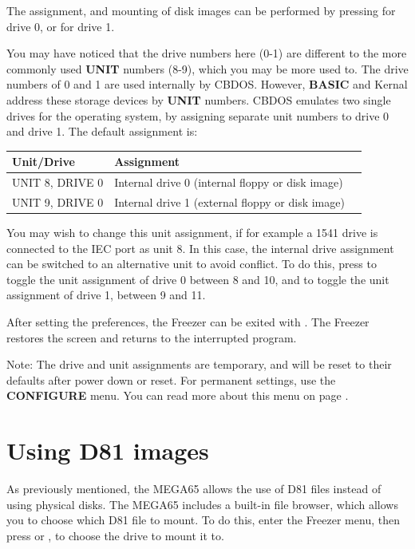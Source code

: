 The assignment, and mounting of disk images can be performed by pressing
 for drive 0, or  for drive 1.

You may have noticed that the drive numbers here (0-1) are different to the more commonly used {\bf UNIT}
numbers (8-9), which you may be more used to. The drive numbers of 0 and 1 are used internally by CBDOS.
However, {\bf BASIC} and Kernal address these storage devices by {\bf UNIT} numbers. CBDOS emulates two single drives for
the operating system, by assigning separate unit numbers to drive 0 and drive 1.
The default assignment is:

\begin{center}
\begin{tabular}{|l|l|l|}
\hline
{\bf Unit/Drive} & {\bf Assignment} \\
\hline
UNIT 8, DRIVE 0  & Internal drive 0 (internal floppy or disk image) \\
UNIT 9, DRIVE 0 & Internal drive 1 (external floppy or disk image) \\
\hline
\end{tabular}
\end{center}


You may wish to change this unit assignment, if for example
a 1541 drive is connected to the IEC port as unit 8.
In this case, the internal drive assignment can be switched to an alternative unit
to avoid conflict. To do this, press  to toggle the unit assignment of drive 0
between 8 and 10, and  to toggle the unit assignment of drive 1, between 9 and 11.

After setting the preferences, the Freezer can be exited
with . The Freezer restores the screen and
returns to the interrupted program.

Note: The drive and unit assignments are temporary, and will be reset to their defaults
after power down or reset. For permanent settings, use the {\bf CONFIGURE}
menu. You can read more about this menu on page \pageref{configuring-chipset}.

\label{sec:d81-images}
\section{Using D81 images}
As previously mentioned, the MEGA65 allows the use of D81 files instead of using physical disks. The MEGA65 includes a
built-in file browser, which allows you to choose which D81 file to mount. To do this, enter the Freezer menu,
then press  or , to choose the drive to mount it to.

